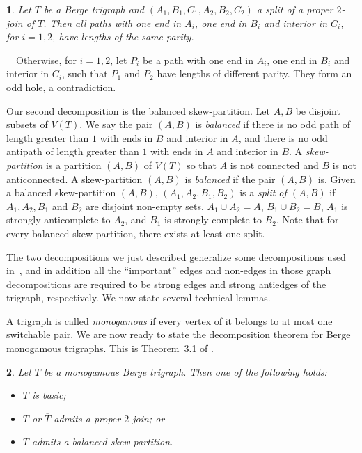 \documentclass[11 pt] {article}
\newcommand\blackslug{\hbox{\hskip 1pt \vrule width 4pt height 8pt depth 1.5pt
        \hskip 1pt}}
\newcommand\bbox{\hfill \quad \blackslug \medbreak}
\newtheorem{theorem}{}[section]
\newcounter{claim}
\newcommand{\Proof}{\setcounter{claim}{0}\noindent{\bf Proof.}\ \ }
\begin{document}
\begin{theorem}
 \label{l:par2Join} Let $T$ be a Berge trigraph and $(A_1, B_1, C_1,
A_2, B_2, C_2)$ a split of a proper $2$-join of $T$. Then all paths
with one end in $A_i$, one end in $B_i$ and interior in $C_i$, for
$i=1, 2$, have lengths of the same parity.
\end{theorem}

\Proof Otherwise, for $i=1, 2$, let $P_i$ be a path with one end in
$A_i$, one end in $B_i$ and interior in $C_i$, such that $P_1$ and
$P_2$ have lengths of different parity. They form an odd hole, a
contradiction. \bbox


Our second decomposition is the balanced skew-partition. Let $A,B$
be disjoint subsets of $V(T)$. We say the pair $(A,B)$ is {\em
 balanced} if there is no odd path of length greater than $1$ with
ends in $B$ and interior in $A$, and there is no odd antipath of
length greater than $1$ with ends in $A$ and interior in $B$. A {\em
 skew-partition} is a partition $(A,B)$ of $V(T)$ so that $A$ is not
connected and $B$ is not anticonnected. A skew-partition $(A,B)$ is {\em balanced} if the pair $(A,B)$ is. 
Given a balanced skew-partition $(A,B)$, $(A_1,A_2,B_1,B_2)$ is a
\emph{split of $(A,B)$} if $A_1, A_2, B_1$ and $B_2$ are disjoint
non-empty sets, $A_1 \cup A_2 =A$, $B_1 \cup B_2=B$, $A_1$ is strongly
anticomplete to $A_2$, and $B_1$ is strongly complete to $B_2$. Note
that for every balanced skew-partition, there exists at least one
split.


The two decompositions we just described generalize some
decompositions used in~\cite{CRST}, and in addition all the
``important'' edges and non-edges in those graph decompositions are
required to be strong edges and strong antiedges of the trigraph,
respectively.  We now state several technical lemmas.


A trigraph is called {\em monogamous} if every vertex of it belongs to
at most one switchable pair. We are now ready to state the
decomposition theorem for Berge monogamous trigraphs. This is
Theorem~3.1 of \cite{trigraphs}.
\begin{theorem} 
\label{noMjointri}
Let $T$ be a monogamous Berge trigraph. Then one of the following holds:
\begin{itemize}
\item $T$ is basic;
\item $T$ or $\overline{T}$ admits a proper $2$-join; or 
\item $T$ admits a balanced skew-partition.
\end{itemize}
\end{theorem}
\end{document}
